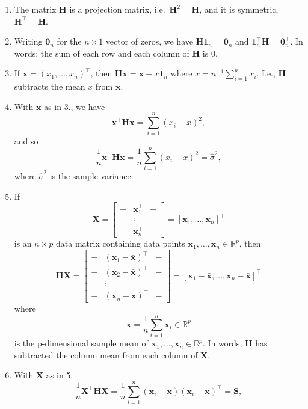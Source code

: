 \documentclass[
]{book}
\providecommand{\tightlist}{%
  \setlength{\itemsep}{0pt}\setlength{\parskip}{0pt}}
\theoremstyle{definition}
\theoremstyle{definition}
\theoremstyle{definition}
\theoremstyle{definition}
\theoremstyle{remark}
\begin{document}
\begin{enumerate}
\def\labelenumi{\arabic{enumi}.}
\tightlist
\item
  The matrix \(\mathbf H\) is a projection matrix, i.e.~\(\mathbf H^2=\mathbf H\), and it is symmetric, \(\mathbf H^\top =\mathbf H\).
\item
  Writing \({\mathbf 0}_n\) for the \(n \times 1\) vector of zeros, we have
  \(\mathbf H{\mathbf 1}_n={\mathbf 0}_n\) and \({\mathbf 1}_n^\top \mathbf H={\mathbf 0}_n^\top.\) In words: the sum of each row and each column of \(\mathbf H\) is \(0\).
\item
  If \(\mathbf x=(x_1, \ldots , x_n)^\top\), then \(\mathbf H\mathbf x= \mathbf x- \bar{x}{\mathbf 1}_n\) where \(\bar{x}=n^{-1}\sum_{i=1}^n x_i\). I.e., \(\mathbf H\) subtracts the mean \(\bar{x}\) from \(\mathbf x\).
\item
  With \(\mathbf x\) as in 3., we have
  \[
  \mathbf x^\top \mathbf H\mathbf x= \sum_{i=1}^n (x_i-\bar{x})^2,
  \]
  and so
  \[
  \frac{1}{n}\mathbf x^\top \mathbf H\mathbf x=\frac{1}{n}\sum_{i=1}^n (x_i-\bar{x})^2 = \hat{\sigma}^2,
  \]
  where \(\hat{\sigma}^2\) is the sample variance.
\item
  If
  \[\mathbf X=\left[\begin{array}{ccc}-&\mathbf x_1^\top&-\\ 
  &\vdots& \\ -&\mathbf x_n^\top&-\end{array}\right] = [\mathbf x_1, \ldots, \mathbf x_n]^\top\]
  is an \(n \times p\) data matrix containing data points \(\mathbf x_1, \ldots, \mathbf x_n\in \mathbb{R}^p\), then
  \[
  \mathbf H\mathbf X=\left[ \begin{array}{ccc}
  -&(\mathbf x_1-\bar{\mathbf x})^\top&-\\
  -&(\mathbf x_2 -\bar{\mathbf x})^\top&-\\
  &\vdots&\\
  -&(\mathbf x_n - \bar{\mathbf x})^\top&-
  \end{array}\right ]= \left[ \mathbf x_1 -\bar{\mathbf x}, \ldots , \mathbf x_n-\bar{\mathbf x}\right]^\top
  \]
  where \[\bar{\mathbf x} = \frac{1}{n} \sum_{i=1}^n \mathbf x_i \in \mathbb{R}^p\]
  is the p-dimensional sample mean of \(\mathbf x_1, \ldots, \mathbf x_n\in \mathbb{R}^p\). In words, \(\mathbf H\) has subtracted the column mean from each column of \(\mathbf X\).
\item
  With \(\mathbf X\) as in 5.
  \[
  \frac{1}{n}\mathbf X^\top \mathbf H\mathbf X=\frac{1}{n} \sum_{i=1}^n (\mathbf x_i -\bar{\mathbf x})(\mathbf x_i -\bar{\mathbf x})^\top =\mathbf S,
\]
\end{enumerate}
\end{document}

